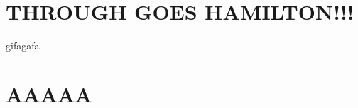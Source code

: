 \documentclass{article}
\begin{document}
\section{THROUGH GOES HAMILTON!!!}
gifagafa
\section{AAAAA}
\end{document}
